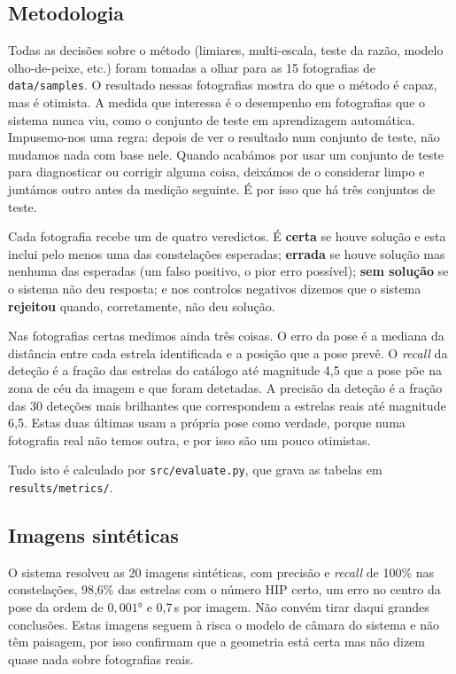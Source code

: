 \documentclass[11pt,a4paper]{article}
\begin{document}
\subsection{Metodologia}

Todas as decisões sobre o método (limiares, multi-escala, teste da razão,
modelo olho-de-peixe, etc.) foram tomadas a olhar para as 15 fotografias de
\texttt{data/samples}. O resultado nessas fotografias mostra do que o método
é capaz, mas é otimista. A medida que interessa é o desempenho em
fotografias que o sistema nunca viu, como o conjunto de teste em aprendizagem
automática. Impusemo-nos uma regra: depois de ver o resultado num conjunto de
teste, não mudamos nada com base nele. Quando acabámos por usar um conjunto
de teste para diagnosticar ou corrigir alguma coisa, deixámos de o
considerar limpo e juntámos outro antes da medição seguinte. É por isso que
há três conjuntos de teste.

Cada fotografia recebe um de quatro veredictos. É \textbf{certa} se houve
solução e esta inclui pelo menos uma das constelações esperadas;
\textbf{errada} se houve solução mas nenhuma das esperadas (um falso
positivo, o pior erro possível); \textbf{sem solução} se o sistema não deu
resposta; e nos controlos negativos dizemos que o sistema \textbf{rejeitou}
quando, corretamente, não deu solução.

Nas fotografias certas medimos ainda três coisas. O erro da pose é a mediana
da distância entre cada estrela identificada e a posição que a pose prevê. O
\emph{recall} da deteção é a fração das estrelas do catálogo até magnitude
4,5 que a pose põe na zona de céu da imagem e que foram detetadas. A
precisão da deteção é a fração das 30 deteções mais brilhantes que
correspondem a estrelas reais até magnitude 6,5. Estas duas últimas usam a
própria pose como verdade, porque numa fotografia real não temos outra, e
por isso são um pouco otimistas.

Tudo isto é calculado por \texttt{src/evaluate.py}, que grava as tabelas em
\texttt{results/metrics/}.

\subsection{Imagens sintéticas}

O sistema resolveu as 20 imagens sintéticas, com precisão e \emph{recall} de
100\% nas constelações, 98,6\% das estrelas com o número HIP certo, um erro
no centro da pose da ordem de $0{,}001°$ e 0,7\,s por imagem. Não convém
tirar daqui grandes conclusões. Estas imagens seguem à risca o modelo de
câmara do sistema e não têm paisagem, por isso confirmam que a geometria está
certa mas não dizem quase nada sobre fotografias reais.
\end{document}
